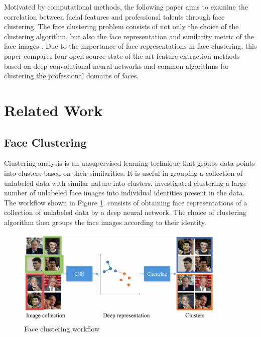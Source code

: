 \documentclass[12pt,english]{article}
\begin{document}
Motivated by computational methods, the following paper aims to examine the correlation between facial features and professional talents through face clustering. The face clustering problem consists of not only the choice of the clustering algorithm, but also the face representation and similarity metric of the face images \cite{shi}. Due to the importance of face representations in face clustering, this paper compares four open-source state-of-the-art feature extraction methods based on deep convolutional neural networks and common algorithms for clustering the professional domains of faces.\\

\section{Related Work}	

\subsection{Face Clustering}

\quad
Clustering analysis is an unsupervised learning technique that groups data points into clusters based on their similarities. It is useful in grouping a collection of unlabeled data with similar nature into clusters. \cite{shi} investigated clustering a large number of unlabeled face images into individual identities present in the data. The workflow shown in Figure \ref{fig:face}. consists of obtaining face representations of a collection of unlabeled data by a deep neural network. The choice of clustering algorithm then groups the face images according to their identity.

\begin{figure}[!tbp]
 \centering
    \includegraphics[width=0.9\textwidth]{figures/otto_faceClustering_workflow.png}
    \caption{Face clustering workflow \cite{shi}}
	\label{fig:face}
\end{figure}
\end{document}
